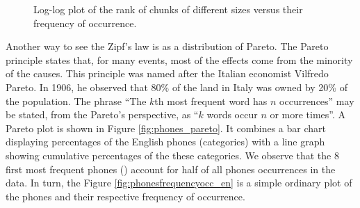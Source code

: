 \begin{figure}[h!]
\noindent{}
\caption{Log-log plot of the rank of chunks of different sizes versus their frequency of occurrence.}
\label{fig:simulate_chunks}
\end{figure}

Another way to see the Zipf's law is as a distribution of Pareto. The Pareto principle states that, for many events, most of the effects come from the minority of the causes.  This principle was named after the Italian economist Vilfredo Pareto. In 1906, he observed that 80\% of the land in Italy was owned by 20\% of the population. The phrase ``The $k$th most frequent word has $n$ occurrences'' may be stated, from the Pareto's perspective, as ``$k$ words occur $n$ or more times''. A Pareto plot is shown in Figure \ref{fig:phones_pareto}. It combines a bar chart displaying percentages of the English phones (categories) with a line graph showing cumulative percentages of the these categories. We observe that the 8 first most frequent phones (\textipa{[@, t, n, s, I, r, d, l]}) account for half of all phones occurrences in the data. 
In turn, the Figure \ref{fig:phonesfrequencyocc_en} is a simple ordinary plot of the phones and their respective frequency of occurrence. 


